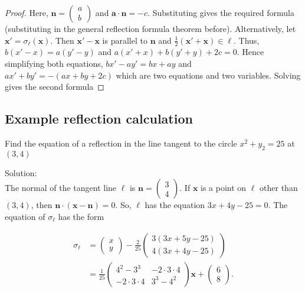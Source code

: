 \begin{proof}
 Here, \( \mathbf{n} = \begin{pmatrix} a \\ b \end{pmatrix}  \) and \( \mathbf{a} \cdot \mathbf{n} = -c\). Substituting gives the required
 formula (substituting in the general reflection formula theorem before). Alternatively, let \( \mathbf{x}' = \sigma_{\ell} \left( \mathbf{x} \right) \). Then 
 \( \mathbf{x'} - \mathbf{x} \) is parallel to \( \mathbf{n}\) and \( \frac{1}{2} \left( \mathbf{x}' + \mathbf{x} \right) \in  \ell\). Thus,
 \( b(x' - x) = a \left( y' - y \right) \) and \( a \left( x' + x \right) + b \left( y' + y \right) + 2c  = 0\). Hence simplifying both equations,
   \( bx' - ay' = bx + ay\) and \( ax' + by' = - \left( ax + by + 2c \right) \) which are two equations and two variables. Solving gives the 
   second formula
\end{proof}

\subsection{Example reflection calculation}

\begin{problem}
 Find the equation of a reflection in the line tangent to the circle \( x^{2} + y_{2} = 25 \) at \( \left( 3, 4 \right) \)
\end{problem}

Solution: \\
The normal of the tangent line \( \ell \) is \( \mathbf{n} = \begin{pmatrix} 3 \\ 4 \end{pmatrix}  \). If \( \mathbf{x} \) is a point on
\( \ell \) other than \( \left( 3, 4 \right) \), then \( \mathbf{n} \cdot \left( \mathbf{x} - \mathbf{n} \right) = 0\). So, \( \ell \) has the equation
\( 3x + 4y - 25 = 0 \). The equation of \( \sigma_{\ell} \) has the form

\begin{align*}
  \sigma_{\ell} &= \begin{pmatrix} x \\ y \end{pmatrix} - \frac{2}{25} \begin{pmatrix} 3 \left( 3x + 5y - 25 \right) \\  4 \left( 3x + 4y - 25 \right) \end{pmatrix} \\
                &= \frac{1}{25} \begin{pmatrix} 4^{2} - 3^{3} & -2 \cdot 3 \cdot 4 \\ -2 \cdot 3 \cdot 4 & 3^{3} - 4^{2} \end{pmatrix} \mathbf{x} + \begin{pmatrix} 6 \\ 8 \end{pmatrix} 
.\end{align*}

